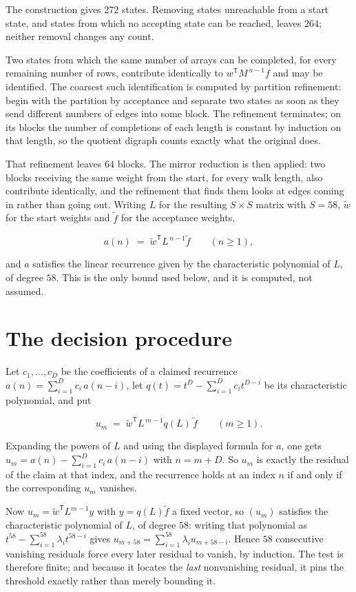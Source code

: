 \documentclass[11pt]{article}
\theoremstyle{definition}
\begin{document}
The construction gives $272$ states. Removing states unreachable from a start state, and states from which no accepting state can be reached, leaves $264$; neither removal changes any count.

Two states from which the same number of arrays can be completed, for every remaining number of rows, contribute identically to $w^{\mathsf T}M^{\,n-1}f$ and may be identified. The coarsest such identification is computed by partition refinement: begin with the partition by acceptance and separate two states as soon as they send different numbers of edges into some block. The refinement terminates; on its blocks the number of completions of each length is constant by induction on that length, so the quotient digraph counts exactly what the original does.

That refinement leaves $64$ blocks. The mirror reduction is then applied: two blocks receiving the same weight from the start, for every walk length, also contribute identically, and the refinement that finds them looks at edges coming in rather than going out. Writing $L$ for the resulting $S \times S$ matrix with $S = 58$, $\tilde w$ for the start weights and $\tilde f$ for the acceptance weights,

\[a(n) \;=\; \tilde w^{\mathsf T} L^{\,n-1} \tilde f \qquad (n \ge 1),\]

and $a$ satisfies the linear recurrence given by the characteristic polynomial of $L$, of degree $58$. This is the only bound used below, and it is computed, not assumed.

\section{The decision procedure}

Let $c_1,\dots,c_D$ be the coefficients of a claimed recurrence $a(n) = \sum_{i=1}^{D} c_i\,a(n-i)$, let $q(t) = t^{D} - \sum_{i=1}^{D} c_i t^{D-i}$ be its characteristic polynomial, and put

\[u_m \;=\; \tilde w^{\mathsf T} L^{\,m-1} q(L)\,\tilde f \qquad (m \ge 1).\]

Expanding the powers of $L$ and using the displayed formula for $a$, one gets $u_m = a(n) - \sum_{i=1}^{D} c_i\,a(n-i)$ with $n = m + D$. So $u_m$ is exactly the residual of the claim at that index, and the recurrence holds at an index $n$ if and only if the corresponding $u_m$ vanishes.

Now $u_m = \tilde w^{\mathsf T} L^{m-1} y$ with $y = q(L)\tilde f$ a fixed vector, so $(u_m)$ satisfies the characteristic polynomial of $L$, of degree $58$: writing that polynomial as $t^{58} - \sum_{i=1}^{58} \lambda_i t^{58-i}$ gives $u_{m+58} = \sum_{i=1}^{58} \lambda_i u_{m+58-i}$. Hence $58$ consecutive vanishing residuals force every later residual to vanish, by induction. The test is therefore finite; and because it locates the {\itshape last} nonvanishing residual, it pins the threshold exactly rather than merely bounding it.
\end{document}
